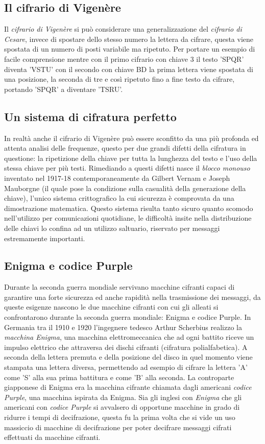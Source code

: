 \documentclass[a4paper, 12pt]{article}
\begin{document}
\subsection{Il cifrario di Vigenère}
Il \textit{cifrario di Vigenère} si può considerare una generalizzazione del \textit{cifrario di Cesare}, invece di spostare dello stesso numero la lettera da cifrare, questa viene spostata di un numero di posti variabile ma ripetuto. Per portare un esempio di facile comprensione mentre con il primo cifrario con chiave 3 il testo 'SPQR' diventa 'VSTU' con il secondo con chiave BD la prima lettera viene spostata di una posizione, la seconda di tre e così ripetuto fino a fine testo da cifrare, portando 'SPQR' a diventare 'TSRU'.
\subsection{Un sistema di cifratura perfetto}
In realtà anche il cifrario di Vigenère può essere sconfitto da una più profonda ed attenta analisi delle frequenze, questo per due grandi difetti della cifratura in questione: la ripetizione della chiave per tutta la lunghezza del testo e l'uso della stessa chiave per più testi.\newline
Rimediando a questi difetti nasce il \textit{blocco monouso} inventato nel 1917-18 contemporaneamente da Gilbert Vernam e Joseph Mauborgne (il quale pose la condizione sulla casualità della generazione della chiave), l'unico sistema crittografico la cui sicurezza è comprovata da una dimostrazione matematica. Questo sistema risulta tanto sicuro quanto scomodo nell'utilizzo per comunicazioni quotidiane, le difficoltà insite nella distribuzione delle chiavi lo confina ad un utilizzo saltuario, riservato per messaggi estremamente importanti.
\subsection{Enigma e codice Purple}
Durante la seconda guerra mondiale servivano macchine cifranti capaci di garantire una forte sicurezza ed anche rapidità nella trasmissione dei messaggi, da queste esigenze nascono le due macchine cifranti con cui gli alleati si confrontarono durante la seconda guerra mondiale: Enigma e codice Purple.
In Germania tra il 1910 e 1920 l'ingegnere tedesco Arthur Scherbius realizzo la \textit{macchina Enigma}, una macchina elettromeccanica che ad ogni battito riceve un impulso elettrico che attraversa dei dischi cifranti (cifratura polialfabetica). A seconda della lettera premuta e della posizione del disco in quel momento viene stampata una lettera diversa, permettendo ad esempio di cifrare la lettera 'A' come 'S' alla sua prima battitura e come 'B' alla seconda.
La controparte giapponese di Enigma era la macchina cifrante chiamata dagli americani \textit{codice Purple}, una macchina ispirata da Enigma.\newline
Sia gli inglesi con \textit{Enigma} che gli americani con \textit{codice Purple} si avvalsero di opportune macchine in grado di ridurre i tempi di decifrazione, questa fu la prima volta che si vide un uso massiccio di macchine di decifrazione per poter decifrare messaggi cifrati effettuati da macchine cifranti.
\end{document}
